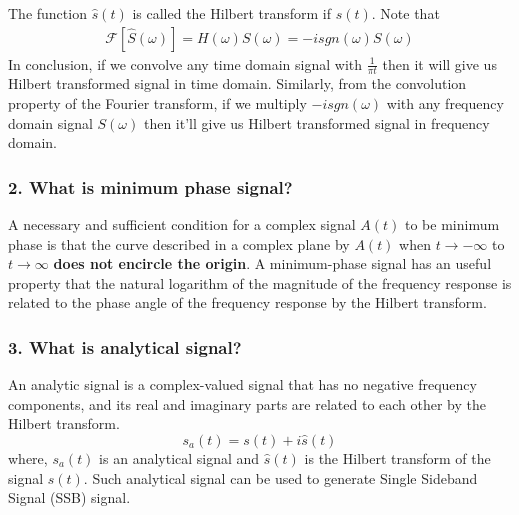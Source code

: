 The function $\hat{s}(t)$ is called the Hilbert transform if $s(t)$. Note that
\begin{equation}
\begin{split}
\mathcal{F}[\hat{S}(\omega)]=H(\omega)S(\omega)=-isgn(\omega)S(\omega)
\end{split}
\label{}
\end{equation}
In conclusion, if we convolve any time domain signal with $\frac{1}{\pi t}$ then it will give us Hilbert transformed signal in time domain. Similarly, from the convolution property of the Fourier transform, if we multiply $-isgn(\omega)$ with any frequency domain signal $S(\omega)$ then it'll give us Hilbert transformed signal in frequency domain.

\subsubsection{2. What is minimum phase signal?}
A necessary and sufficient condition for a complex signal $A(t)$ to be minimum phase is that the curve described in a complex plane by $A(t)$ when $t\rightarrow -\infty$ to $t\rightarrow \infty$ \textbf{does not encircle the origin}. A minimum-phase signal has an useful property that the natural logarithm of the magnitude of the frequency response is related to the phase angle of the frequency response by the Hilbert transform.

\subsubsection{3. What is analytical signal?}
An analytic signal is a complex-valued signal that has no negative frequency components, and its real and imaginary parts are related to each other by the Hilbert transform.
\begin{equation}
s_a(t)=s(t)+i\hat{s}(t)
\label{Analytical signal}
\end{equation}
where, $s_a(t)$ is an analytical signal and $\hat{s}(t)$ is the Hilbert transform of the signal ${s}(t)$. Such analytical signal can be used to generate Single Sideband Signal (SSB) signal.

